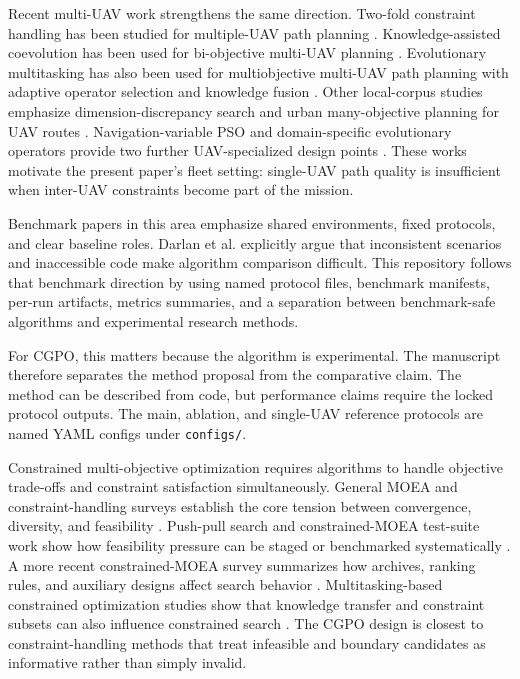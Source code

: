 \documentclass[a4paper,fleqn]{cas-dc}
\begin{document}
Recent multi-UAV work strengthens the same direction. Two-fold constraint handling has been studied for multiple-UAV path planning \cite{zhang2024twofold_uav}. Knowledge-assisted coevolution has been used for bi-objective multi-UAV planning \cite{zhou2024tskac}. Evolutionary multitasking has also been used for multiobjective multi-UAV path planning with adaptive operator selection and knowledge fusion \cite{meng2025emmop}. Other local-corpus studies emphasize dimension-discrepancy search and urban many-objective planning for UAV routes \cite{xu2024dimension_uav,hohmann2023urban_uav}. Navigation-variable PSO and domain-specific evolutionary operators provide two further UAV-specialized design points \cite{duong2025nmopso_uav,darlan2026domainops}. These works motivate the present paper's fleet setting: single-UAV path quality is insufficient when inter-UAV constraints become part of the mission.

Benchmark papers in this area emphasize shared environments, fixed protocols, and clear baseline roles. Darlan et al. \cite{darlan2025benchmark} explicitly argue that inconsistent scenarios and inaccessible code make algorithm comparison difficult. This repository follows that benchmark direction by using named protocol files, benchmark manifests, per-run artifacts, metrics summaries, and a separation between benchmark-safe algorithms and experimental research methods.

For CGPO, this matters because the algorithm is experimental. The manuscript therefore separates the method proposal from the comparative claim. The method can be described from code, but performance claims require the locked protocol outputs. The main, ablation, and single-UAV reference protocols are named YAML configs under \texttt{configs/}.

Constrained multi-objective optimization requires algorithms to handle objective trade-offs and constraint satisfaction simultaneously. General MOEA and constraint-handling surveys establish the core tension between convergence, diversity, and feasibility \cite{zhou2011moea_survey,mezura2011constraint_survey}. Push-pull search and constrained-MOEA test-suite work show how feasibility pressure can be staged or benchmarked systematically \cite{fan2019pushpull,ma2019cmop_test}. A more recent constrained-MOEA survey summarizes how archives, ranking rules, and auxiliary designs affect search behavior \cite{liang2023cmop_survey}. Multitasking-based constrained optimization studies show that knowledge transfer and constraint subsets can also influence constrained search \cite{ming2024emt_cmop,yu2024constraint_emt}. The CGPO design is closest to constraint-handling methods that treat infeasible and boundary candidates as informative rather than simply invalid.
\end{document}
